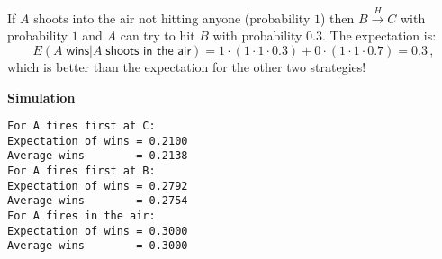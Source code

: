  If $A$ shoots into the air not hitting anyone (probability $1$) then $B\stackrel{H}{\longrightarrow}C$ with probability $1$ and $A$ can try to hit $B$ with probability $0.3$. The expectation is:
\[
E(A \;\textsf{wins}|A\;\textsf{shoots in the air}) = 1\cdot (1\cdot 1 \cdot 0.3) + 0\cdot(1\cdot 1\cdot 0.7)=0.3\,,
\]
which is better than the expectation for the other two strategies!

\textbf{Simulation}
\begin{verbatim}
For A fires first at C:
Expectation of wins = 0.2100
Average wins        = 0.2138
For A fires first at B:
Expectation of wins = 0.2792
Average wins        = 0.2754
For A fires in the air:
Expectation of wins = 0.3000
Average wins        = 0.3000
\end{verbatim}

